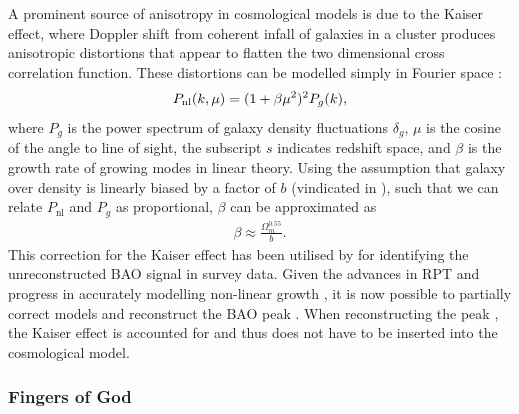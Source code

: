 \documentclass[titlesmallcaps, examinerscopy, copyrightpage]{uqthesis}
\begin{document}
A prominent source of anisotropy in cosmological models is due to the Kaiser effect, where Doppler shift from coherent infall of galaxies in a cluster produces anisotropic distortions that appear to flatten the two dimensional cross correlation function. These distortions can be modelled simply in Fourier space \citep{Kaiser1987}:
\begin{align} \label{eq:gaztanga1}
P_{\rm{nl}}(k, \mu) = (1 + \beta \mu^2)^2 P_{g}(k),
\end{align}
where $P_{g}$ is the power spectrum of galaxy density fluctuations $\delta_g$, $\mu$ is the cosine of the angle to line of sight, the subscript $s$ indicates redshift space, and $\beta$ is the growth rate of growing modes in linear theory. Using the assumption that galaxy over density is linearly biased by a factor of $b$ (vindicated in \citet{ReidSpergelBode2009}), such that we can relate $P_{\text{nl}}$ and $P_{g}$ as proportional, $\beta$ can be approximated as \citep{Hamilton1992}
\begin{align}
\beta \approx \frac{\Omega_m^{0.55}}{b}.
\end{align}
This correction for the Kaiser effect has been utilised by \citet{ChuangWang2012, XuPadmanabhan2012, Gaztanaga2009} for identifying the unreconstructed BAO signal in survey data. Given the advances in RPT and progress in accurately modelling non-linear growth \citep{CrocceScoccimarro2006, Matsubara2008Resumming, Matsubara2008, TaruyaNishimichi2009}, it is now possible to partially correct models and reconstruct the BAO peak \citep{EisensteinSeoSirko2007, SeoEckelEisenstein2010, PadmanabhanXuEisenstein2012, KazinKoda2014}. When reconstructing the peak \citep[see][for details]{KazinKoda2014,PadmanabhanXuEisenstein2012}, the Kaiser effect is accounted for and thus does not have to be inserted into the cosmological model.



\subsubsection{Fingers of God}
\end{document}
